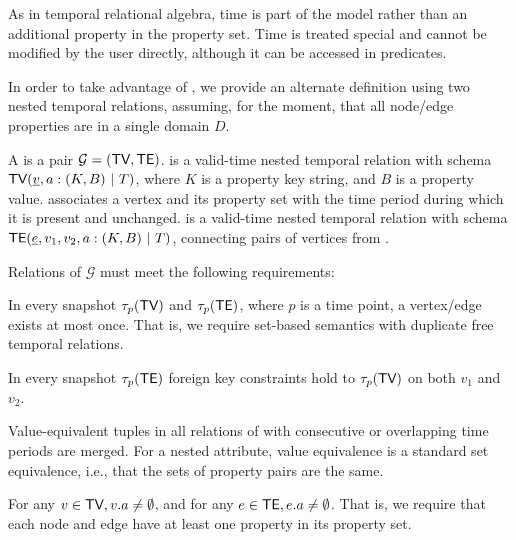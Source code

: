 As in temporal relational algebra, time is part of the model rather
than an additional property in the property set.  Time is treated
special and cannot be modified by the user directly, although it can
be accessed in predicates.  

In order to take advantage of \tra, we provide an alternate definition
using two nested temporal relations, assuming, for the
  moment, that all node/edge properties are in a single domain $D$.

\begin{definition}
\label{def:tg2}
A \tg is a pair $\mathcal{G}=(\textsf{TV}, \textsf{TE})$. \tv is a valid-time nested
temporal relation with schema $\textsf{TV}(\underline{v}, a: (K,B) ~|~T)$,
where $K$ is a property key string, and $B$ is a property value.
  \tv
associates a vertex and its property set with the time period during
which it is present and unchanged. \te is a valid-time nested temporal
relation with schema $\textsf{TE}(\underline{e}, v_1, v_2, a:
(K,B) ~|~T)$, connecting pairs of vertices from \tv.

Relations of $\mathcal{G}$ must meet the following requirements:

\begin{description}[noitemsep,itemindent=\dimexpr\labelwidth+\labelsep\relax,leftmargin=0pt]
\item [R1: Unique vertices/ edges] In every snapshot $\tau_p (\textsf{TV})$
  and $\tau_p (\textsf{TE})$, where $p$ is a time point, a vertex/edge
  exists at most once.  That is, we require set-based semantics with
  duplicate free temporal relations.
\item [R2: Referential integrity] In every snapshot $\tau_p(\textsf{TE})$
  foreign key constraints hold to $\tau_p (\textsf{TV})$ on both $v_1$ and
  $v_2$.
\item [R3: Coalesced] Value-equivalent tuples in all relations of \tve
  with consecutive or overlapping time periods are merged.  For a
  nested attribute, value equivalence is a standard set equivalence,
  i.e., that the sets of property pairs are the same.
\item [R4: Required property] For any $v \in \textsf{TV},
  v.a\neq\emptyset$, and for any $e \in \textsf{TE}, e.a\neq\emptyset$.
  That is, we require that each node and edge have at least one
  property in its property set.
\end{description}
\end{definition}

